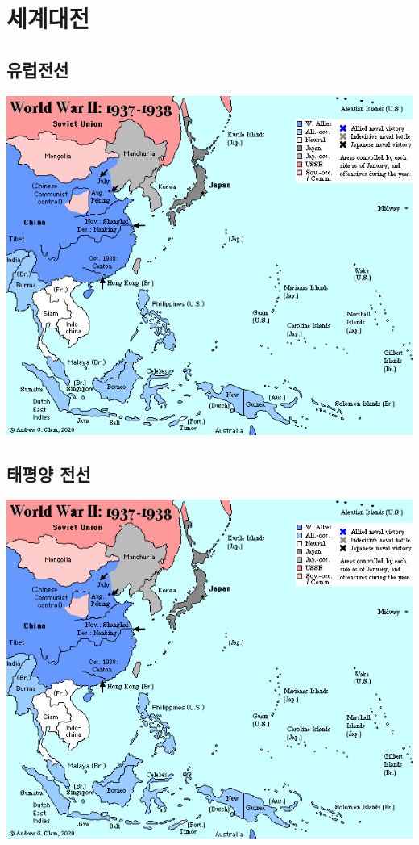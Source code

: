 \documentclass[
  letterpaper,
  chapter,a4paper,showtrims,openright,hidelinks]{oblivoir}
\begin{document}
\hypertarget{uxc138uxacc4uxb300uxc804}{%
\section{세계대전}\label{uxc138uxacc4uxb300uxc804}}

\hypertarget{uxc720uxb7fduxc804uxc120}{%
\subsection{유럽전선}\label{uxc720uxb7fduxc804uxc120}}

\includegraphics{images/world_war_europe.gif}

\hypertarget{uxd0dcuxd3c9uxc591-uxc804uxc120}{%
\subsection{태평양 전선}\label{uxd0dcuxd3c9uxc591-uxc804uxc120}}

\includegraphics{images/world_war_pacific.gif}
\end{document}
